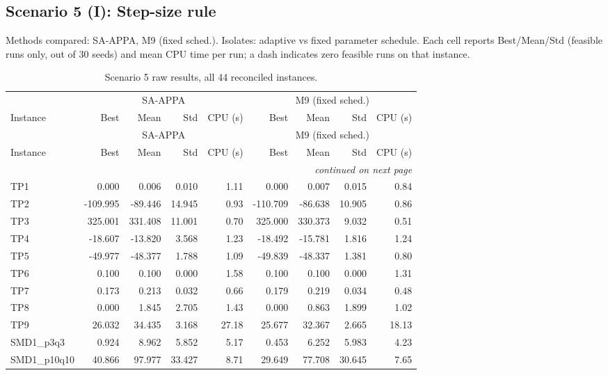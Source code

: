 \subsection{Scenario 5 (I): Step-size rule}
\label{app:scenario5}
Methods compared: SA-APPA, M9 (fixed sched.). Isolates: adaptive vs fixed parameter schedule. Each cell reports Best/Mean/Std (feasible runs only, out of 30 seeds) and mean CPU time per run; a dash indicates zero feasible runs on that instance.

\begingroup\scriptsize
\begin{longtable}{lrrrrrrrr}
\caption{Scenario 5 raw results, all 44 reconciled instances.}\label{tab:scenario5}\\
\toprule
 & \multicolumn{4}{c}{SA-APPA} & \multicolumn{4}{c}{M9 (fixed sched.)} \\
\cmidrule(lr){2-5} \cmidrule(lr){6-9}
Instance & Best & Mean & Std & CPU (s) & Best & Mean & Std & CPU (s) \\
\midrule
\endfirsthead
\toprule
 & \multicolumn{4}{c}{SA-APPA} & \multicolumn{4}{c}{M9 (fixed sched.)} \\
\cmidrule(lr){2-5} \cmidrule(lr){6-9}
Instance & Best & Mean & Std & CPU (s) & Best & Mean & Std & CPU (s) \\
\midrule
\endhead
\midrule\multicolumn{9}{r}{\emph{continued on next page}}\\\midrule
\endfoot
\bottomrule
\endlastfoot
TP1 & 0.000 & 0.006 & 0.010 & 1.11 & 0.000 & 0.007 & 0.015 & 0.84 \\
TP2 & -109.995 & -89.446 & 14.945 & 0.93 & -110.709 & -86.638 & 10.905 & 0.86 \\
TP3 & 325.001 & 331.408 & 11.001 & 0.70 & 325.000 & 330.373 & 9.032 & 0.51 \\
TP4 & -18.607 & -13.820 & 3.568 & 1.23 & -18.492 & -15.781 & 1.816 & 1.24 \\
TP5 & -49.977 & -48.377 & 1.788 & 1.09 & -49.839 & -48.337 & 1.381 & 0.80 \\
TP6 & 0.100 & 0.100 & 0.000 & 1.58 & 0.100 & 0.100 & 0.000 & 1.31 \\
TP7 & 0.173 & 0.213 & 0.032 & 0.66 & 0.179 & 0.219 & 0.034 & 0.48 \\
TP8 & 0.000 & 1.845 & 2.705 & 1.43 & 0.000 & 0.863 & 1.899 & 1.02 \\
TP9 & 26.032 & 34.435 & 3.168 & 27.18 & 25.677 & 32.367 & 2.665 & 18.13 \\
SMD1\_p3q3 & 0.924 & 8.962 & 5.852 & 5.17 & 0.453 & 6.252 & 5.983 & 4.23 \\
SMD1\_p10q10 & 40.866 & 97.977 & 33.427 & 8.71 & 29.649 & 77.708 & 30.645 & 7.65 \\

\end{longtable}
